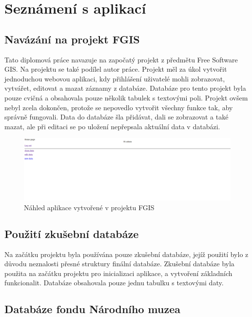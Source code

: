\chapter{Seznámení s aplikací}
\label{3-seznameni-s-aplikaci}

\section{Navázání na projekt FGIS}

Tato diplomová práce navazuje na započatý projekt z předmětu Free
Software GIS. Na projektu se také podílel autor práce. 
Projekt měl za úkol vytvořit jednoduchou webovou aplikaci, kdy
přihlášení uživatelé mohli zobrazovat, vytvářet, editovat a mazat záznamy
z databáze. Databáze pro tento projekt byla pouze cvičná a obsahovala
pouze několik tabulek s textovými poli. Projekt ovšem nebyl zcela
dokončen, protože se nepovedlo vytvořit všechny funkce tak, aby
správně fungovali. Data do databáze šla přidávat, dali se zobrazovat a
také mazat, ale při editaci se po uložení nepřepsala aktuální data v
databázi.

\begin{figure}[H] \centering
    \includegraphics[width=400pt]{./pictures/4-nahled-menu-fgis.PNG}
    \caption[Náhled aplikace vytvořené v projektu FGIS]{Náhled aplikace vytvořené v projektu FGIS}
	\label{fig:Náhled aplikace}              
\end{figure}

 \newpage
 
 \section{Použití zkušební databáze}
 
Na začátku projektu byla používána pouze zkušební databáze, jejíž použití 
bylo z důvodu neznalosti přesné struktury finální databáze. Zkušební databáze 
byla použita na začátku projektu pro inicializaci aplikace, a vytvoření základních 
funkcionalit. Databáze obsahovala pouze jednu tabulku s textovými daty.


\section{Databáze fondu Národního muzea}

